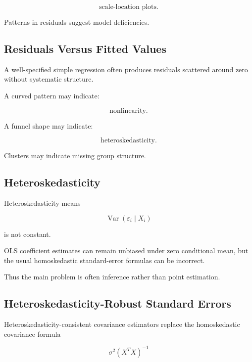\[
\boxed{
\text{scale-location plots}.
}
\]

Patterns in residuals suggest model deficiencies.

\subsection{Residuals Versus Fitted Values}
\label{subsec:residuals-versus-fitted}

A well-specified simple regression often produces residuals scattered
around zero without systematic structure.

A curved pattern may indicate:

\[
\boxed{
\text{nonlinearity}.
}
\]

A funnel shape may indicate:

\[
\boxed{
\text{heteroskedasticity}.
}
\]

Clusters may indicate missing group structure.

\subsection{Heteroskedasticity}
\label{subsec:heteroskedasticity}

Heteroskedasticity means

\[
\boxed{
\operatorname{Var}
(
\varepsilon_i\mid X_i
)
}
\]

is not constant.

OLS coefficient estimates can remain unbiased under zero conditional
mean, but the usual homoskedastic standard-error formulas can be
incorrect.

Thus the main problem is often inference rather than point estimation.

\subsection{Heteroskedasticity-Robust Standard Errors}
\label{subsec:robust-standard-errors}

Heteroskedasticity-consistent covariance estimators replace the
homoskedastic covariance formula

\[
\sigma^2(X^TX)^{-1}
\]

